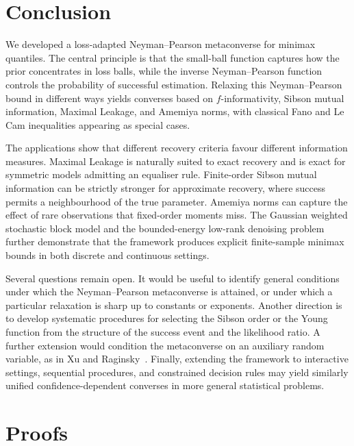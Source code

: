 \documentclass[11pt]{article}
\theoremstyle{definition}
\theoremstyle{remark}
\newcommand{\1}{\boldsymbol{1}}
\begin{document}
\section{Conclusion}

We developed a loss-adapted Neyman--Pearson metaconverse for minimax
quantiles. The central principle is that the small-ball function captures
how the prior concentrates in loss balls, while the inverse
Neyman--Pearson function controls the probability of successful
estimation. Relaxing this Neyman--Pearson bound in different ways yields
converses based on \(f\)-informativity, Sibson mutual information, Maximal
Leakage, and Amemiya norms, with classical Fano and Le Cam inequalities
appearing as special cases.

The applications show that different recovery criteria favour different
information measures. Maximal Leakage is naturally suited to exact recovery and
is exact for symmetric models admitting an equaliser rule. Finite-order Sibson
mutual information can be strictly stronger for approximate recovery, where
success permits a neighbourhood of the true parameter. Amemiya norms can
capture the effect of rare observations that fixed-order moments miss. The Gaussian weighted stochastic block
model and the bounded-energy low-rank denoising problem further
demonstrate that the framework produces explicit finite-sample minimax
bounds in both discrete and continuous settings.

Several questions remain open. It would be useful to identify general
conditions under which the Neyman--Pearson metaconverse is attained, or
under which a particular relaxation is sharp up to constants or
exponents. Another direction is to develop systematic procedures for
selecting the Sibson order or the Young function from the structure of
the success event and the likelihood ratio. A further extension would
condition the metaconverse on an auxiliary random variable, as in Xu and
Raginsky~\cite{XuRaginsky2017}. Finally, extending the
framework to interactive settings, sequential procedures, and
constrained decision rules may yield similarly unified
confidence-dependent converses in more general statistical problems.




\appendix
\section{Proofs}
\label{app:proofs}
\end{document}
